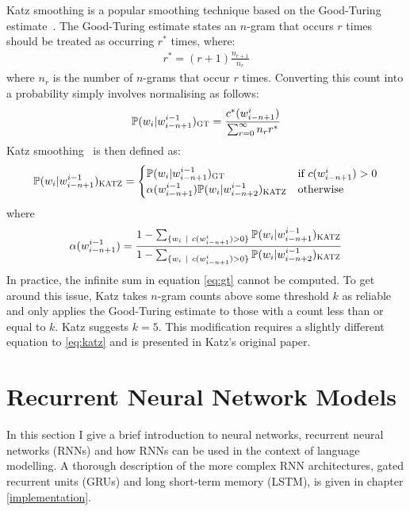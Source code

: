 \documentclass[a4paper, 12pt]{report}
\begin{document}
Katz smoothing is a popular smoothing technique based on the Good-Turing estimate~\cite{good_turing:good1953}. The Good-Turing estimate states an $n$-gram that occurs $r$ times should be treated as occurring $r^*$ times, where:
\begin{gather*}
	r^* = (r + 1)\frac{n_{r + 1}}{n_r}
\end{gather*}
where $n_r$ is the number of $n$-grams that occur $r$ times. Converting this count into a probability simply involves normalising as follows:
\begin{gather} \label{eq:gt}
	\mathbb{P}(w_i | w_{i - n + 1}^{i - 1})_{\text{\scshape GT}} = \frac{c^*(w_{i - n + 1}^{i})}{\sum_{r = 0}^\infty n_r r^*}
\end{gather}
Katz smoothing~\cite{katz_smoothing:katz1987} is then defined as:
\begin{gather} \label{eq:katz}
	\mathbb{P}(w_i | w_{i - n + 1}^{i - 1})_{\text{\scshape KATZ}} = \begin{cases}
		\mathbb{P}(w_i | w_{i - n + 1}^{i - 1})_{\text{\scshape GT}} &\text{if }c(w_{i - n + 1}^i) > 0 \\
		\alpha(w_{i - n + 1}^{i - 1})\mathbb{P}(w_i | w_{i - n + 2}^{i - 1})_{\text{\scshape KATZ}} &\text{otherwise}
	\end{cases}
\end{gather}
where
\begin{gather*}
	\alpha(w_{i - n + 1}^{i - 1}) = \frac{1 - \sum_{\{w_i\ |\ c(w_{i - n + 1}^i) > 0\}} \mathbb{P}(w_i | w_{i - n + 1}^{i - 1})_{\text{\scshape KATZ}}}{1 - \sum_{\{w_i\ |\ c(w_{i - n + 1}^i) > 0\}} \mathbb{P}(w_i | w_{i - n + 2}^{i - 1})_{\text{\scshape KATZ}}}
\end{gather*}
In practice, the infinite sum in equation \ref{eq:gt} cannot be computed. To get around this issue, Katz takes $n$-gram counts above some threshold $k$ as reliable and only applies the Good-Turing estimate to those with a count less than or equal to $k$. Katz suggests $k = 5$. This modification requires a slightly different equation to \ref{eq:katz} and is presented in Katz's original paper.

\section{Recurrent Neural Network Models}

In this section I give a brief introduction to neural networks, recurrent neural networks (RNNs) and how RNNs can be used in the context of language modelling. A thorough description of the more complex RNN architectures, gated recurrent units (GRUs) and long short-term memory (LSTM), is given in chapter \ref{implementation}.
\end{document}
